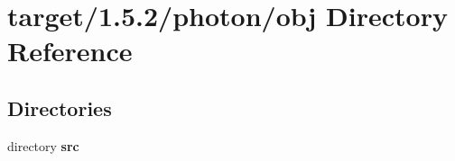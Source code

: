 \section{target/1.5.2/photon/obj Directory Reference}
\label{dir_ef15f7c4665927f41f7cf48d6094990d}
\subsection*{Directories}
\begin{DoxyCompactItemize}
\item 
directory \textbf{ src}
\end{DoxyCompactItemize}
